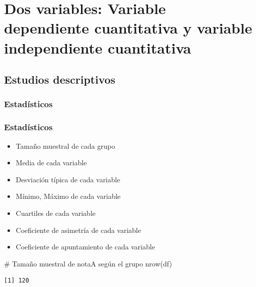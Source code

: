 \documentclass[
  spanish,
  a4paper,
]{scrreport}
\newenvironment{Shaded}{\begin{snugshade}}{\end{snugshade}}
\newcommand{\CommentTok}[1]{\textcolor[rgb]{0.37,0.37,0.37}{#1}}
\newcommand{\FunctionTok}[1]{\textcolor[rgb]{0.28,0.35,0.67}{#1}}
\newcommand{\NormalTok}[1]{\textcolor[rgb]{0.00,0.23,0.31}{#1}}
\providecommand{\tightlist}{%
  \setlength{\itemsep}{0pt}\setlength{\parskip}{0pt}}
\theoremstyle{definition}
\theoremstyle{definition}
\theoremstyle{remark}
\begin{document}
\section{Dos variables: Variable dependiente cuantitativa y variable
independiente
cuantitativa}\label{dos-variables-variable-dependiente-cuantitativa-y-variable-independiente-cuantitativa}

\subsection{Estudios descriptivos}\label{estudios-descriptivos-5}

\subsubsection{Estadísticos}\label{estaduxedsticos-5}

\subsubsection{Estadísticos}\label{estaduxedsticos-6}

\begin{itemize}
\tightlist
\item
  Tamaño muestral de cada grupo
\item
  Media de cada variable
\item
  Desviación típica de cada variable
\item
  Mínimo, Máximo de cada variable
\item
  Cuartiles de cada variable
\item
  Coeficiente de asimetría de cada variable
\item
  Coeficiente de apuntamiento de cada variable
\end{itemize}

\begin{Shaded}
\begin{Highlighting}[]
\CommentTok{\# Tamaño muestral de notaA según el grupo}
\FunctionTok{nrow}\NormalTok{(df)}
\end{Highlighting}
\end{Shaded}

\begin{verbatim}
[1] 120
\end{verbatim}
\end{document}
